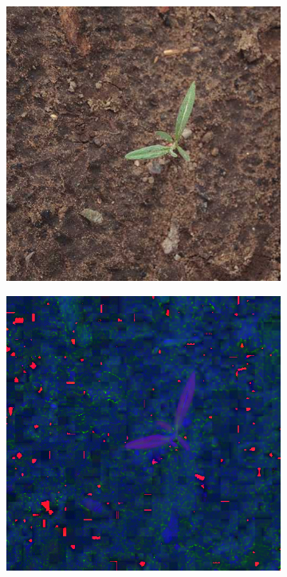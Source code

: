 \begin{figure}[]
    \centering
    \captionsetup[subfigure]{justification=centering}
    \begin{subfigure}[b]{0.3\textwidth}
        \centering
        \includegraphics[width=\textwidth]{./figure/result/segmentation/imgORIGINAL.png}
		\caption{}
		\label{fig:seg_a}
    \end{subfigure}
    \begin{subfigure}[b]{0.3\textwidth}
        \centering
        \includegraphics[width=\textwidth]{./figure/result/segmentation/imgHSI.png}

\end{subfigure}
\end{figure}
